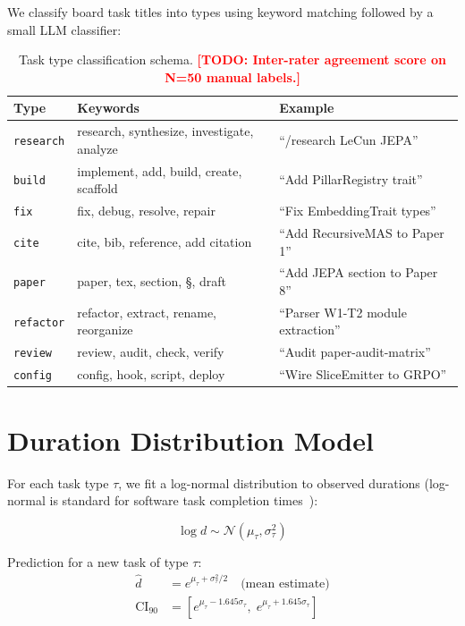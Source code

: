 \documentclass[sigconf]{acmart}
\newcommand{\todo}[1]{\textcolor{red}{\textbf{[TODO: #1]}}}
\begin{document}
We classify board task titles into types using keyword matching
followed by a small LLM classifier:

\begin{table}[h]
\centering
\small
\begin{tabular}{lll}
\toprule
Type & Keywords & Example \\
\midrule
\texttt{research}    & research, synthesize, investigate, analyze & ``/research LeCun JEPA'' \\
\texttt{build}       & implement, add, build, create, scaffold   & ``Add PillarRegistry trait'' \\
\texttt{fix}         & fix, debug, resolve, repair               & ``Fix EmbeddingTrait types'' \\
\texttt{cite}        & cite, bib, reference, add citation        & ``Add RecursiveMAS to Paper 1'' \\
\texttt{paper}       & paper, tex, section, \S, draft            & ``Add JEPA section to Paper 8'' \\
\texttt{refactor}    & refactor, extract, rename, reorganize     & ``Parser W1-T2 module extraction'' \\
\texttt{review}      & review, audit, check, verify              & ``Audit paper-audit-matrix'' \\
\texttt{config}      & config, hook, script, deploy              & ``Wire SliceEmitter to GRPO'' \\
\bottomrule
\end{tabular}
\caption{Task type classification schema. \todo{Inter-rater agreement score on N=50 manual labels.}}
\end{table}

\section{Duration Distribution Model}
\label{sec:system}

For each task type $\tau$, we fit a log-normal distribution to observed
durations (log-normal is standard for software task completion times~\cite{mende2010}):

\[
  \log d \sim \mathcal{N}(\mu_\tau, \sigma_\tau^2)
\]

Prediction for a new task of type $\tau$:
\begin{align}
  \hat{d} &= e^{\mu_\tau + \sigma_\tau^2/2} \quad \text{(mean estimate)} \\
  \text{CI}_{90} &= [e^{\mu_\tau - 1.645\sigma_\tau},\; e^{\mu_\tau + 1.645\sigma_\tau}]
\end{align}
\end{document}
